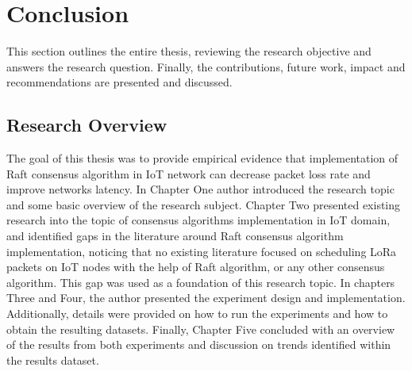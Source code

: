 \documentclass[oneside,12pt]{book}
\begin{document}
\chapter{Conclusion}
This section outlines the entire thesis, reviewing the research objective and answers the research question. Finally, the contributions, future work, impact and recommendations are presented and discussed.
\section{Research Overview}
The goal of this thesis was to provide empirical evidence that implementation of Raft consensus algorithm in IoT network can decrease packet loss rate and improve networks latency. In Chapter One author introduced the research topic and some basic overview of the research subject. Chapter Two presented existing research into the topic of consensus algorithms implementation in IoT domain, and identified gaps in the literature around Raft consensus algorithm implementation, noticing that no existing literature focused on scheduling LoRa packets on IoT nodes with the help of Raft algorithm, or any other consensus algorithm. This gap was used as a foundation of this research topic. In chapters Three and Four, the author presented the experiment design and implementation. Additionally, details were provided on how to run the experiments and how to obtain the resulting datasets. Finally, Chapter Five concluded with an overview of the results from both experiments and discussion on trends identified within the results dataset.
\end{document}
